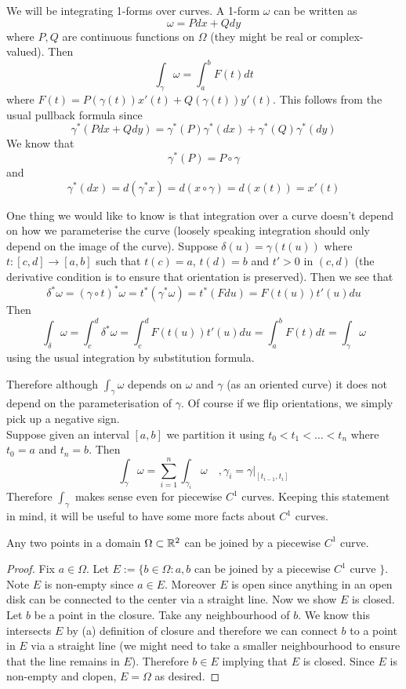 We will be integrating 1-forms over curves. A 1-form $\omega$ can be written as 
$$\omega = Pdx + Qdy$$
where $P, Q$ are continuous functions on $\Omega$ (they might be real or complex-valued). Then
$$ \int_{\gamma} \omega = \int_a^b F(t) dt$$
where $F(t) = P(\gamma(t))x'(t) + Q(\gamma(t)) y'(t)$. This follows from the usual pullback formula since
$$ \gamma^*(Pdx + Qdy) = \gamma^*(P)\gamma^*(dx) + \gamma^*(Q)\gamma^*(dy) $$
We know that 
$$\gamma^*(P) = P \circ \gamma$$
and
$$ \gamma^*(dx) = d(\gamma^* x) = d(x \circ \gamma) = d(x(t)) = x'(t) $$

One thing we would like to know is that integration over a curve doesn't depend on how we parameterise the curve (loosely speaking integration should only depend on the image of the curve). Suppose $\delta(u) = \gamma(t(u))$ where $t: [c, d] \to [a, b]$ such that $t(c) = a$, $t(d) = b$ and $t' > 0$ in $(c, d)$ (the derivative condition is to ensure that orientation is preserved). Then we see that
$$ \delta^*\omega = (\gamma \circ t)^*\omega = t^*(\gamma^* \omega) = t^*(F du) = F(t(u)) t'(u) du $$
Then
$$ \int_{\delta} \omega = \int_{c}^d \delta^* \omega = \int_c^d F(t(u)) t'(u) du = \int_a^b F(t) dt = \int_\gamma \omega $$
using the usual integration by substitution formula. 

Therefore although $\displaystyle \int_\gamma \omega$ depends on $\omega$ and $\gamma$ (as an oriented curve) it does not depend on the parameterisation of $\gamma$. Of course if we flip orientations, we simply pick up a negative sign.\\

Suppose given an interval $[a, b]$ we partition it using $t_0 < t_1 < \dots < t_n$ where $t_0 = a$ and $t_n = b$. Then
$$ \int_\gamma \omega = \sum_{i = 1}^n \int_{\gamma_i} \omega \quad, \gamma_i = \gamma|_{[t_{i - 1}, t_i]} $$
Therefore $\int_\gamma$ makes sense even for piecewise $C^1$ curves. Keeping this statement in mind, it will be useful to have some more facts about $C^1$ curves.
\begin{lemma}
Any two points in a domain $\Omega \subset \mathbb{R}^2$ can be joined by a piecewise $C^1$ curve.
\end{lemma}
\begin{proof}
    Fix $a \in \Omega$. Let $E := \{ b \in \Omega : a, b \text{ can be joined by a piecewise $C^1$ curve } \}$. Note $E$ is non-empty since $a \in E$. Moreover $E$ is open since anything in an open disk can be connected to the center via a straight line. Now we show $E$ is closed. Let $b$ be a point in the closure. Take any neighbourhood of $b$. We know this intersects $E$ by (a) definition of closure and therefore we can connect $b$ to a point in $E$ via a straight line (we might need to take a smaller neighbourhood to ensure that the line remains in $E$). Therefore $b \in E$ implying that $E$ is closed. Since $E$ is non-empty and clopen, $E = \Omega$ as desired.  
\end{proof}

